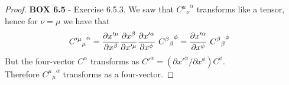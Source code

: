 \documentclass[11pt]{article}
\theoremstyle{definition}
\begin{document}
\begin{proof}{\textbf{BOX 6.5} - Exercise 6.5.3.}
    We saw that ${{C^\mu}_{\nu}}^\alpha$ transforms like a tensor, hence for
    $\nu = \mu$ we have that
    \begin{align*}
        {{C'^\mu}_{\mu}}^\alpha
        &= \partialderivative{x'^\mu}{x^\beta}
        \partialderivative{x^\beta}{x'^\mu}
        \partialderivative{x'^\alpha}{x^\phi}~
        {{C^{\beta}}_{\beta}}^\phi
        = \partialderivative{x'^\alpha}{x^\phi}~
        {{C^{\beta}}_{\beta}}^\phi
    \end{align*}
    But the four-vector $C^{\alpha}$ transforms as
    $C'^{\alpha} = (\partial x'^\alpha/\partial x^\phi) C^\phi$.\\
    Therefore ${{C^\mu}_{\mu}}^\alpha$ transforms as a four-vector.

\end{proof}
\end{document}
